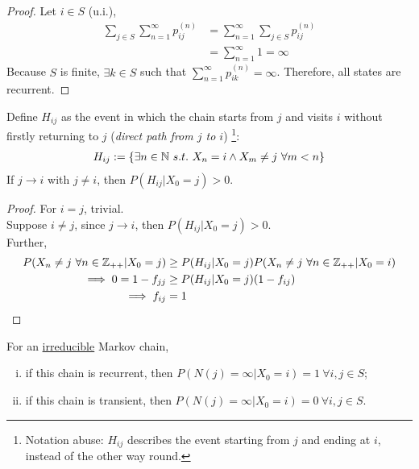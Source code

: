 \documentclass{article}
\newcommand{\upn}[0]{^{(n)}}
\begin{document}
    \begin{proof}
    	Let $i \in S$ (u.i.),
    	\begin{align}
    		\sum_{j \in S} \sum_{n=1}^\infty p_{ij}\upn
    		&= \sum_{n=1}^\infty \sum_{j \in S} p_{ij}\upn \\
    		&= \sum_{n=1}^\infty 1 = \infty
    	\end{align}
    	Because $S$ is finite, $\exists k \in S$ such that $\sum_{n=1}^\infty p_{ik}\upn = \infty$. Therefore, all states are recurrent.
    \end{proof}
    
    \begin{theorem}
    	Define $H_{ij}$ as the event in which the chain starts from $j$ and visits $i$ without firstly returning to $j$ (\emph{direct path from $j$ to $i$}) \footnote{Notation abuse: $H_{ij}$ describes the event starting from $j$ and ending at $i$, instead of the other way round.}:
    	\begin{align}
    		H_{ij} := \{\exists n \in \mathbb{N}\ s.t.\ X_n = i \land X_m \neq j\ \forall m < n\}
    	\end{align}
    	If $j \to i$ with $j \neq i$, then $P(H_{ij}|X_0=j) > 0$.
    \end{theorem}
    
    \begin{theorem}[$f$-Lemma]
    \end{theorem}
    
    \begin{proof}
    	For $i = j$, trivial. \\
    	Suppose $i \neq j$, since $j \to i$, then $P(H_{ij}|X_0=j)> 0$. \\
    	Further,
    	\begin{align}
    		P(X_n \neq j\ \forall n \in \mathbb{Z}_{++} | X_0=j)
    		&\geq P(H_{ij}|X_0=j) P(X_n \neq j\ \forall n \in \mathbb{Z}_{++} | X_0=i)\\
    		\implies 0 = 1 - f_{jj} &\geq P(H_{ij}|X_0=j) (1 - f_{ij}) \\
    		\implies f_{ij} &= 1
    	\end{align}
    \end{proof}
    
    \begin{lemma}
    	For an \ul{irreducible} Markov chain,
    	\begin{enumerate}[(i)]
    		\item if this chain is recurrent, then $P(N(j)=\infty|X_0=i)=1\ \forall i, j \in S$;
    		\item if this chain is transient, then $P(N(j)=\infty|X_0=i)=0\ \forall i, j \in S$.
    	\end{enumerate}
    \end{lemma}
    
\end{document}
